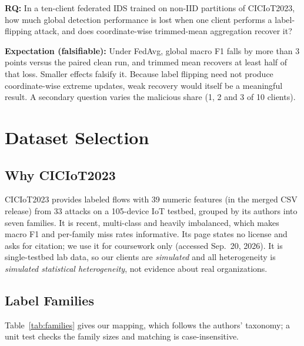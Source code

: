 \documentclass[journal]{IEEEtran}
\begin{document}
\textbf{RQ:} In a ten-client federated IDS trained on non-IID partitions of
CICIoT2023, how much global detection performance is lost when one client
performs a label-flipping attack, and does coordinate-wise trimmed-mean
aggregation \cite{yin2018} recover it?

\textbf{Expectation (falsifiable):} Under FedAvg, global macro F1 falls by
more than 3 points versus the paired clean run, and trimmed mean recovers at
least half of that loss. Smaller effects falsify it. Because label flipping
need not produce coordinate-wise extreme updates, weak recovery would itself
be a meaningful result. A secondary question varies the malicious share
(1, 2 and 3 of 10 clients).

\section{Dataset Selection}

\subsection{Why CICIoT2023}
CICIoT2023 \cite{neto2023} provides labeled flows with 39 numeric features (in the merged CSV release)
from 33 attacks on a 105-device IoT testbed, grouped by its authors into seven
families. It is recent, multi-class and heavily imbalanced, which makes macro
F1 and per-family miss rates informative. Its page states no license and asks
for citation; we use it for coursework only (accessed Sep.~20, 2026). It is
single-testbed lab data, so our clients are \emph{simulated} and all
heterogeneity is \emph{simulated statistical heterogeneity}, not evidence
about real organizations.

\subsection{Label Families}
Table~\ref{tab:families} gives our mapping, which follows the authors'
taxonomy; a unit test checks the family sizes and matching is
case-insensitive.
\end{document}
